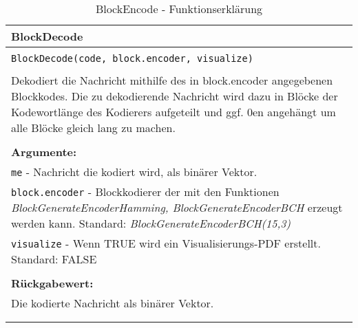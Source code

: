 \begin{longtable}{|p{\textwidth}|}
\hline
\rowcolor{lightblue}BlockDecode\\
\hline
\\
\texttt{BlockDecode(code, block.encoder, visualize)}\\
\\
Dekodiert die Nachricht mithilfe des in block.encoder angegebenen Blockkodes. Die zu dekodierende Nachricht wird dazu in Blöcke der Kodewortlänge des Kodierers aufgeteilt und ggf. 0en angehängt um alle Blöcke gleich lang zu machen. \\
\\
\textbf{Argumente:}\\
\texttt{me} - Nachricht die kodiert wird, als binärer Vektor.\\
\texttt{block.encoder} - Blockkodierer der mit den Funktionen \emph{BlockGenerateEncoderHamming, BlockGenerateEncoderBCH} erzeugt werden kann. Standard: \emph{BlockGenerateEncoderBCH(15,3)}\\
\texttt{visualize} - Wenn TRUE wird ein Visualisierungs-PDF erstellt. Standard: FALSE\\
\\
\textbf{Rückgabewert:}\\
Die kodierte Nachricht als binärer Vektor.\\
\\
\hline
\caption{BlockEncode - Funktionserklärung}
\end{longtable}